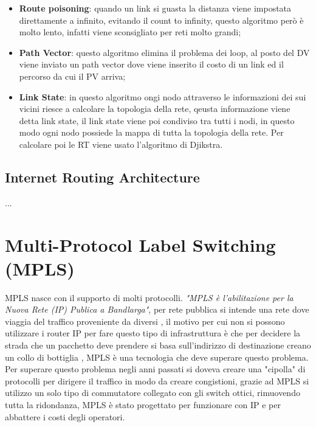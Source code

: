 \documentclass[12pt]{article}
\begin{document}
\begin{itemize}
\begin{figure}[H]
            \caption{Path Hold Down}
            \label{fig:path-hold-down}
        \end{figure}
        Il paht hold down non risolve il problema del count to infinity, questo pu\`o essere superato dall'utilizzo combinato con lo spli horizon;
    \item \textbf{Route poisoning}: quando un link si guasta la distanza viene impostata direttamente a infinito, evitando il count to infinity, questo algoritmo per\`o \`e molto lento, infatti viene sconsigliato per reti molto grandi;
    \item \textbf{Path Vector}: questo algoritmo elimina il problema dei loop, al posto del DV viene inviato un path vector dove viene inserito il costo di un link ed il percorso da cui il PV arriva;
    \item \textbf{Link State}: in questo algoritmo ongi nodo attraverso le informazioni dei sui vicini riesce a calcolare la topologia della rete, qeusta informazione viene detta link state, il link state viene poi condiviso tra tutti i nodi, in questo modo ogni nodo possiede la mappa di tutta la topologia della rete. Per calcolare poi le RT viene usato l'algoritmo di Djikstra.
\end{itemize}


\subsection{Internet Routing Architecture}
...


\newpage
\section{Multi-Protocol Label Switching (MPLS)}
MPLS nasce con il supporto di molti protocolli. \emph{"MPLS \`e l'abilitazione per la Nuova Rete (IP) Publica a Bandlarga"}, per rete pubblica si intende una rete dove viaggia del traffico proveniente da diversi , il motivo per cui non si possono utilizzare i router IP per fare questo tipo di infrastruttura \`e che per decidere la strada che un pacchetto deve prendere si basa sull'indirizzo di destinazione creano un collo di bottiglia , MPLS \`e una tecnologia che deve superare questo problema. Per superare questo problema negli anni passati si doveva creare una "cipolla" di protocolli per dirigere il traffico in modo da creare congistioni, grazie ad MPLS si utilizzo un solo tipo di commutatore collegato con gli switch ottici, rimuovendo tutta la ridondanza, MPLS \`e stato progettato per funzionare con IP e per abbattere i costi degli operatori.
\end{document}
